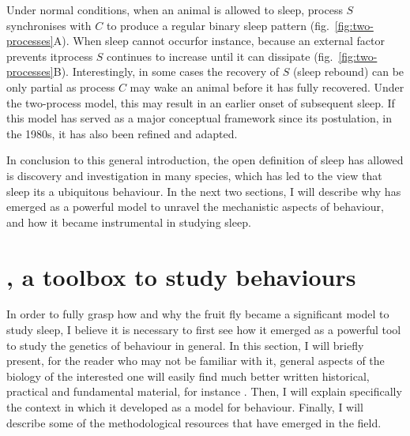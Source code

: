 


Under normal conditions, when an animal is allowed to sleep, process $S$ synchronises with $C$
to produce a regular binary sleep pattern (fig.~\ref{fig:two-processes}A).
When sleep cannot occur\emd{}for instance, because an external factor prevents it\emd{}process $S$ continues to increase until it can dissipate (fig.~\ref{fig:two-processes}B). 
Interestingly, in some cases the recovery of $S$ (sleep rebound) can be only partial as process $C$ may wake an animal before it has fully recovered. 
Under the two-process model, this may result in an earlier onset of subsequent sleep.
If this model has served as a major conceptual framework since its postulation, in the 1980s, it has also been refined\cite{borbely_two-process_2016} and adapted\cite{skeldon_mathematical_2014}.

In conclusion to this general introduction, the open definition of sleep has allowed is discovery and investigation in many species, which has led to the view that sleep its a ubiquitous behaviour.
In the next two sections, I will describe why \dmel{} has emerged as a powerful model to unravel the mechanistic aspects of behaviour, and how it became instrumental in studying sleep.

\clearpage
\section{\dmel{}, a toolbox to study behaviours}
\label{sec:droso-as-model}

In order to fully grasp how and why the fruit fly became a significant model to study sleep,
I believe it is necessary to first see how it emerged as a powerful tool to study the genetics of behaviour in general.
In this section, I will briefly present, for the reader who may not be familiar with it, general aspects of the biology of \dmel\emd{}the interested one will easily find much better written historical, practical and fundamental material, for instance \cite{greenspan_fly_2004,mohr_first_2018,markow_natural_2015}.
Then, I will explain specifically the context in which it developed as a model for behaviour.
Finally, I will describe some of the methodological resources that have emerged in the field.

